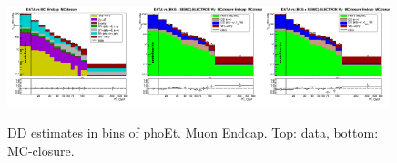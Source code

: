 \begin{figure}[htb]
\begin{center}
   \includegraphics[width=0.33\textwidth]{../figs/figs_v11/ELECTRON_WGamma/PrepareYields/c_TotalDATAvsMC_Endcap__phoEt_MCclosure.png}\includegraphics[width=0.33\textwidth]{../figs/figs_v11/ELECTRON_WGamma/PrepareYields/c_DATAvsBkgPlusSigMCc_ELECTRON_WGamma_TEMPL_CHISO_UNblind_MCclosure__Endcap__phoEt_MCclosure.png}\includegraphics[width=0.33\textwidth]{../figs/figs_v11/ELECTRON_WGamma/PrepareYields/c_DATAvsBkgPlusSigMCc_ELECTRON_WGamma_TEMPL_SIHIH_UNblind_MCclosure__Endcap__phoEt_MCclosure.png}
  \caption{DD estimates in bins of phoEt. Muon Endcap. Top: data, bottom: MC-closure.}
  \end{center}
\end{figure}
